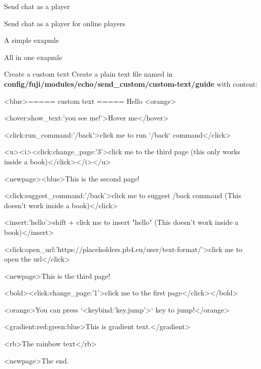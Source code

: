 \begin{example}{Send chat as a player}
\end{example}

\begin{example}{Send chat as a player for online players}
\end{example}


\begin{example}{A simple exapmle}
\end{example}

\begin{example}{All in one exapmle}
\end{example}


\begin{example}{Create a custom text}
    Create a plain text file named  in \textbf{config/fuji/modules/echo/send\_custom/custom-text/guide} with content:
    \begin{textcode}
        <blue>===== custom text =====
        Hello <orange>%

        <hover:show_text:'you see me!'>Hover me</hover>

        <click:run_command:'/back'>click me to run `/back` command</click>

        <u><i><click:change_page:'3'>click me to the third page (this only works inside a book)</click></i></u>

        <newpage><blue>This is the second page!

        <click:suggest_command:'/back'>click me to suggest /back command (This doesn't work inside a book)</click>

        <insert:'hello'>shift + click me to insert "hello" (This doesn't work inside a book)</insert>

        <click:open_url:'https://placeholders.pb4.eu/user/text-format/'>click me to open the url</click>

        <newpage>This is the third page!

        <bold><click:change_page:'1'>click me to the first page</click></bold>

        <orange>You can press `<keybind:'key.jump'>` key to jump!</orange>

        <gradient:red:green:blue>This is gradient text.</gradient>

        <rb>The rainbow text</rb>

        <newpage>The end.
    \end{textcode}
\end{example}

